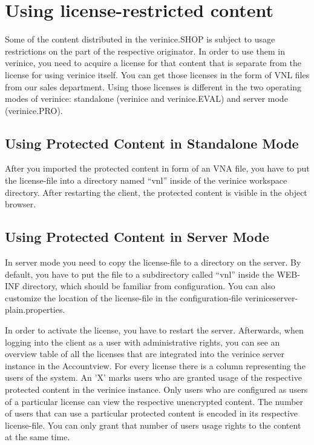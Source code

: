 \documentclass[a4paper,10pt]{book}
\begin{document}
\section{Using license-restricted content} \label{sec:Using license-restricted content}

Some of the content distributed in the verinice.SHOP is subject to usage restrictions on the part of the respective originator. In order to use them in verinice, you need to acquire a license for that content that is separate from the license for using verinice itself. You can get those licenses in the form of VNL files from our sales department. Using those licenses is different in the two operating modes of verinice: standalone (verinice and verinice.EVAL) and server mode (verinice.PRO).

\subsection{Using Protected Content in Standalone Mode}

After you imported the protected content in form of an VNA file, you have to put the license-file into a directory named ``vnl'' inside of the verinice workspace directory. After restarting the client, the protected content is visible in the object browser.

\subsection{Using Protected Content in Server Mode}

In server mode you need to copy the license-file to a directory on the server. By default, you have to put the file to a subdirectory called ``vnl'' inside the WEB-INF directory, which should be familiar from configuration. You can also customize the location of the license-file in the configuration-file veriniceserver-plain.properties.

In order to activate the license, you have to restart the server. Afterwards, when logging into the client as a user with administrative rights, you can see an overview table of all the licenses that are integrated into the verinice server instance in the Accountview. For every license there is a column representing the users of the system. An 'X' marks users who are granted usage of the respective protected content in the verinice instance. Only users who are configured as users of a particular license can view the respective unencrypted content. The number of users that can use a particular protected content is encoded in its respective license-file. You can only grant that number of users usage rights to the content at the same time.
\end{document}
